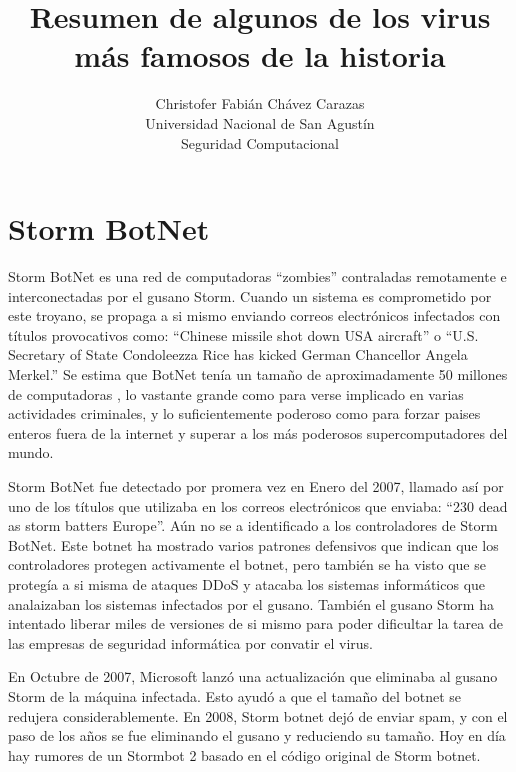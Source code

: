 \documentclass[a4paper,12pt]{article}
\begin{document}
\title{Resumen de algunos de los virus más famosos de la historia}
\author{
Christofer Fabián Chávez Carazas \\
\small{Universidad Nacional de San Agustín} \\
\small{Seguridad Computacional}
}

\maketitle


\section{Storm BotNet}

Storm BotNet es una red de computadoras ``zombies'' contraladas remotamente e interconectadas por el gusano Storm.
Cuando un sistema es comprometido por este troyano, se propaga a si mismo enviando correos
electrónicos infectados con títulos provocativos como: ``Chinese missile shot down USA aircraft'' o
``U.S. Secretary of State Condoleezza Rice has kicked German Chancellor Angela Merkel.''\cite{storm}
Se estima que BotNet tenía un tamaño de aproximadamente 50 millones de computadoras \cite{storm}, lo vastante grande
como para verse implicado en varias actividades criminales, y lo suficientemente poderoso como para forzar paises enteros
fuera de la internet y superar a los más poderosos supercomputadores del mundo.  \par

Storm BotNet fue detectado por promera vez en Enero del 2007, llamado así por uno de los títulos que utilizaba en los correos
electrónicos que enviaba: ``230 dead as storm batters Europe''. Aún no se a identificado a los controladores de Storm BotNet.
Este botnet ha mostrado varios patrones defensivos que indican que los controladores protegen activamente el botnet, pero también
se ha visto que se protegía a si misma de ataques DDoS y atacaba los sistemas informáticos que analaizaban los sistemas infectados por
el gusano. También el gusano Storm ha intentado liberar miles de versiones de si mismo para poder dificultar la tarea de
las empresas de seguridad informática por convatir el virus.

En Octubre de 2007, Microsoft lanzó una actualización que eliminaba al gusano Storm de la máquina infectada. Esto ayudó a que
el tamaño del botnet se redujera considerablemente. En 2008, Storm botnet dejó de enviar spam, y con el paso de los años se fue eliminando
el gusano y reduciendo su tamaño. Hoy en día hay rumores de un Stormbot 2 basado en el código original de Storm botnet.
\end{document}
